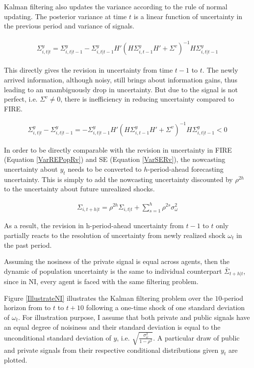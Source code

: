 \documentclass[12pt]{article}
\begin{document}
	Kalman filtering also updates the variance according to the rule of normal updating.   The posterior variance at time $t$ is a linear function of uncertainty in the previous period and variance of signals. 
	
	\begin{eqnarray}
		\begin{aligned}
			\Sigma^y_{i,t|t} = \Sigma^y_{i,t|t-1} - \Sigma^y_{i,t|t-1} H'{(H \Sigma^y_{i,t-1} H' +\Sigma^v)}^{-1} H \Sigma^y_{i,t|t-1} 
		\end{aligned}
	\end{eqnarray}
	
	This directly gives the revision in uncertainty from time $t-1$ to $t$. The newly arrived information, although noisy, still brings about information gains, thus leading to an unambiguously drop in uncertainty. But due to the signal is not perfect, i.e. $\Sigma^v \neq 0$, there is inefficiency in reducing uncertainty compared to FIRE. 
	
	\begin{eqnarray}\label{VarNIRv}
		\Sigma^y_{i,t|t} - \Sigma^y_{i,t|t-1} = - \Sigma^y_{i,t|t-1} H'{(H \Sigma^y_{i,t-1} H' +\Sigma^v)}^{-1} H \Sigma^y_{i,t|t-1} <0
	\end{eqnarray}
	
	In order to be directly comparable with the revision in uncertainty in FIRE (Equation \ref{VarREPopRv}) and SE (Equation \ref{VarSERv}), the nowcasting uncertainty about $y_t$ needs to be converted to $h$-period-ahead forecasting uncertainty. This is simply to add the nowcasting uncertainty discounted by $\rho^{2h}$ to the uncertainty about future unrealized shocks.   
	
	\begin{eqnarray}\label{VarNIEq}
		\Sigma_{i,t+h|t} = \rho^{2h} \Sigma_{i,t|t} + \sum^{h}_{s=1}\rho^{2s} \sigma^2_{\omega}
	\end{eqnarray}
	
	As a result, the revision in h-period-ahead uncertainty from $t-1$ to $t$ only partially reacts to the resolution of uncertainty from newly realized shock $\omega_t$ in the past period. 
	
	Assuming the nosiness of the private signal is equal across agents, then the dynamic of population uncertainty is the same to individual counterpart $\bar \Sigma_{t+h|t}$, since in NI, every agent is faced with the same filtering problem.  
	
	Figure \ref{IllustrateNI} illustrates the Kalman filtering problem over the $10$-period horizon from to $t$ to $t+10$  following a one-time shock of one standard deviation of $\omega_t$.  For illustration purpose, I assume that both private and public signals have an equal degree of noisiness and their standard deviation is equal to the unconditional standard deviation of $y$, i.e. $\sqrt{\frac{\sigma^2_\omega}{1-\rho^2}}$.  A particular draw of public and private signals from their respective conditional distributions given $y_t$ are plotted.    
	
\end{document}
